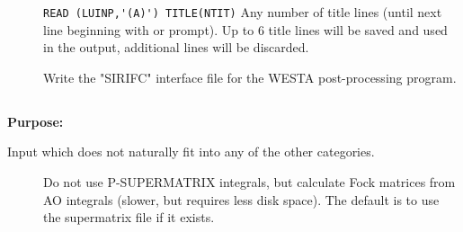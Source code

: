 \begin{description}
\item[] 
  \verb"READ (LUINP,'(A)') TITLE(NTIT)" 
  Any number of title lines (until next line beginning with
   or \quotekw{*} prompt).
  Up to 6 title lines will be saved and used in the output, additional
  lines will be discarded.

\item[]
  Write the "SIRIFC" interface file for the WESTA post-processing program.

\end{description}




\pagebreak[3]
\subsection{\label{ref-auxinp}}

{\bf Purpose:}

Input which does not naturally fit into any of the other
categories.

\begin{description}
\item[]
  Do not use P-SUPERMATRIX integrals, but calculate Fock matrices
  from AO integrals (slower, but requires less disk space). The
  default is to use the supermatrix file if it exists.

\end{description}

